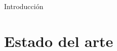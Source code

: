 \documentclass[spanish,a4paper]{beamer}%
\begin{document}
\begin{frame}{Introducción}
{\begin{figure}[htbp]
{\begin{subfigure}[b]{0.38\textwidth}
	\end{subfigure}
	\hfill}
%
\label{fig:valdemingomez_cc_TEG_iTPV}
\end{figure}
}
	\end{frame}

	\section{Estado del arte}
\end{document}
